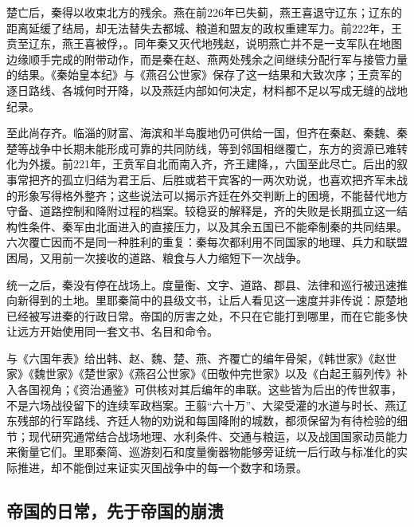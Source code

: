楚亡后，秦得以收束北方的残余。燕在前226年已失蓟，燕王喜退守辽东；辽东的距离延缓了结局，却无法替失去都城、粮道和盟友的政权重建军力。前222年，王贲至辽东，燕王喜被俘，。同年秦又灭代地残赵，说明燕亡并不是一支军队在地图边缘顺手完成的附带动作，而是秦在赵、燕两处残余之间继续分配行军与接管力量的结果。《秦始皇本纪》与《燕召公世家》保存了这一结果和大致次序；王贲军的逐日路线、各城何时开降，以及燕廷内部如何决定，材料都不足以写成无缝的战地纪录。

至此尚存齐。临淄的财富、海滨和半岛腹地仍可供给一国，但齐在秦赵、秦魏、秦楚等战争中长期未能形成可靠的共同防线，等到邻国相继覆亡，东方的资源已难转化为外援。前221年，王贲军自北而南入齐，齐王建降，，六国至此尽亡。后出的叙事常把齐的孤立归结为君王后、后胜或若干宾客的一两次劝说，也喜欢把齐军未战的形象写得格外整齐；这些说法可以揭示齐廷在外交判断上的困境，不能替代地方守备、道路控制和降附过程的档案。较稳妥的解释是，齐的失败是长期孤立这一结构性条件、秦军由北面进入的直接压力，以及其余五国已不能牵制秦的共同结果。六次覆亡因而不是同一种胜利的重复：秦每次都利用不同国家的地理、兵力和联盟困局，又用前一次接收的道路、粮食与人力缩短下一次战争。

统一之后，秦没有停在战场上。度量衡、文字、道路、郡县、法律和巡行被迅速推向新得到的土地。里耶秦简中的县级文书，让后人看见这一速度并非传说：原楚地已经被写进秦的行政日常。帝国的厉害之处，不只在它能打到哪里，而在它能多快让远方开始使用同一套文书、名目和命令。

\begin{sourcenote}[统一不是单一人物的一步棋]
与《六国年表》给出韩、赵、魏、楚、燕、齐覆亡的编年骨架，《韩世家》《赵世家》《魏世家》《楚世家》《燕召公世家》《田敬仲完世家》以及《白起王翦列传》补入各国视角；《资治通鉴》可供核对其后编年的串联。这些皆为后出的传世叙事，不是六场战役留下的连续军政档案。王翦“六十万”、大梁受灌的水道与时长、燕辽东残部的行军路线、齐廷人物的劝说和每国降附的城数，都须保留为有待检验的细节；现代研究通常结合战场地理、水利条件、交通与粮运，以及战国国家动员能力来衡量它们。里耶秦简、巡游刻石和度量衡器物能够旁证统一后行政与标准化的实际推进，却不能倒过来证实灭国战争中的每一个数字和场景。
\end{sourcenote}



\subsection{帝国的日常，先于帝国的崩溃}

